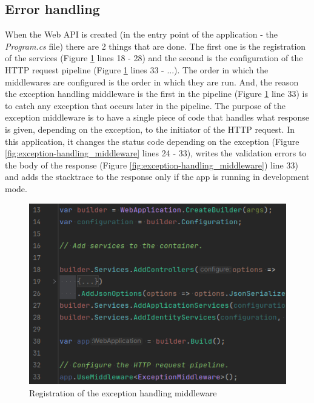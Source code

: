 \subsection{Error handling}

\par When the Web API is created (in the entry point of the application - the \textit{Program.cs} file) there are 2 things that are done. The first one is the registration of the services (Figure \ref{fig:exception-handling_registration} lines 18 - 28) and the second is the configuration of the HTTP request pipeline (Figure \ref{fig:exception-handling_registration} lines 33 - ...). The order in which the middlewares are configured is the order in which they are run. And, the reason the exception handling middleware is the  first in the pipeline (Figure \ref{fig:exception-handling_registration} line 33) is to catch any exception that occurs later in the pipeline. The purpose of the exception middleware is to have a single piece of code that handles what response is given, depending on the exception, to the initiator of the HTTP request. In this application, it changes the status code depending on the exception (Figure \ref{fig:exception-handling_middleware} lines 24 - 33), writes the validation errors to the body of the response (Figure \ref{fig:exception-handling_middleware}) line  33) and adds the stacktrace to the response only if the app is running in development mode.

\begin{figure}
    \centering
    \includegraphics[width=1\linewidth]{exception-handling_registration.png}
    \caption{Registration of the exception handling middleware}
    \label{fig:exception-handling_registration}
\end{figure}

